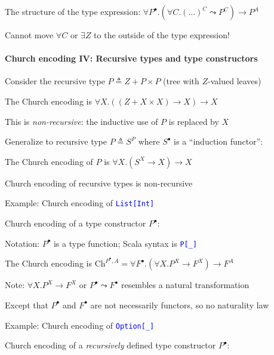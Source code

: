 The structure of the type expression: $\forall P^{\bullet}.\left(\forall C.(...)^{C}\leadsto P^{C}\right)\rightarrow P^{A}$

Cannot move $\forall C$ or $\exists Z$ to the outside of the type
expression!


\paragraph{Church encoding IV: Recursive types and type constructors}

Consider the recursive type {\footnotesize{}$P\triangleq Z+P\times P$}
(tree with $Z$-valued leaves)

The Church encoding is {\footnotesize{}$\forall X.\left(\left(Z+X\times X\right)\rightarrow X\right)\rightarrow X$}{\footnotesize\par}

This is \emph{non-recursive}: the inductive use of $P$ is replaced
by $X$

Generalize to recursive type $P\triangleq S^{P}$ where $S^{\bullet}$
is a \textsf{``}induction functor\textsf{''}:

The Church encoding of $P$ is {\footnotesize{}$\forall X.\left(S^{X}\rightarrow X\right)\rightarrow X$}{\footnotesize\par}

Church encoding of recursive types is non-recursive

Example: Church encoding of \texttt{\textcolor{blue}{\footnotesize{}List{[}Int{]}}} 

Church encoding of a type constructor $P^{\bullet}$:

Notation: $P^{\bullet}$ is a type function; Scala syntax is \texttt{\textcolor{blue}{\footnotesize{}P{[}\_{]}}} 

The Church encoding is {\footnotesize{}$\text{Ch}^{P^{\bullet},A}=\forall F^{\bullet}.\left(\forall X.P^{X}\rightarrow F^{X}\right)\rightarrow F^{A}$}{\footnotesize\par}

Note: $\forall X.P^{X}\rightarrow F^{X}$ or $P^{\bullet}\leadsto F^{\bullet}$
resembles a natural transformation

Except that $P^{\bullet}$ and $F^{\bullet}$ are not necessarily
functors, so no naturality law

Example: Church encoding of \texttt{\textcolor{blue}{\footnotesize{}Option{[}\_{]}}} 

Church encoding of a \emph{recursively} defined type constructor $P^{\bullet}$:

